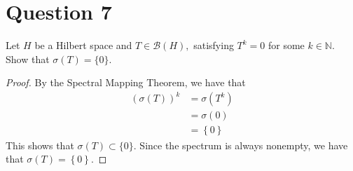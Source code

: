 \section{Question 7}

\horz

Let $H$ be a Hilbert space and $T\in \mathcal B(H),$ satisfying $T^k= 0$ for some $k\in \mathbb N.$ Show that $\sigma(T) = \{0\}.$

\horz

\begin{proof}
    By the Spectral Mapping Theorem, we have that 
    \begin{align*}
	(\sigma (T))^{k} &=  \sigma \left( T^{k} \right) \\
	&= \sigma \left( 0 \right) \\
	&= \left\{ 0 \right\}
    \end{align*}
    This shows that $ \sigma \left( T \right) \subset \{ 0 \}$. Since the spectrum is always nonempty, we have that $\sigma \left( T \right) = \left\{ 0 \right\}$.
\end{proof}
